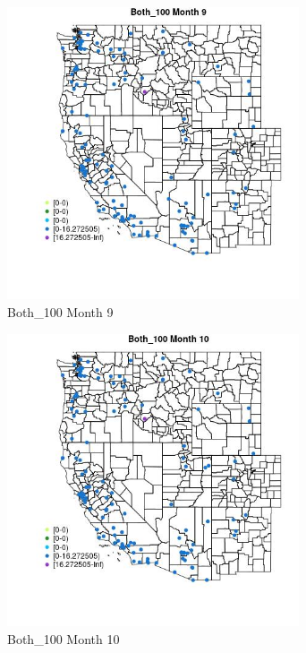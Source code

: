 \begin{figure} 
\centering  
\includegraphics[width=0.77\textwidth]{Code_Outputs/Report_ML_input_PM25_Step4_part_e_de_duplicated_aves_MapObsMo9Both_100.jpg} 
\caption{\label{fig:Report_ML_input_PM25_Step4_part_e_de_duplicated_avesMapObsMo9Both_100}Both_100 Month 9} 
\end{figure} 
 

\begin{figure} 
\centering  
\includegraphics[width=0.77\textwidth]{Code_Outputs/Report_ML_input_PM25_Step4_part_e_de_duplicated_aves_MapObsMo10Both_100.jpg} 
\caption{\label{fig:Report_ML_input_PM25_Step4_part_e_de_duplicated_avesMapObsMo10Both_100}Both_100 Month 10} 
\end{figure} 
 

